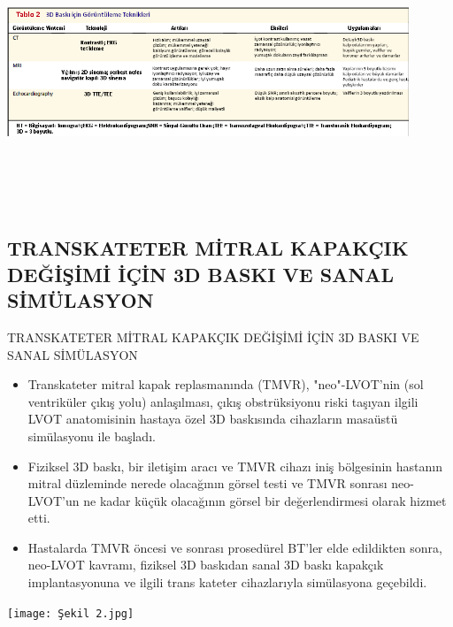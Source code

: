 \documentclass{beamer}
\begin{document}
\begin{frame}{}
\begin{block}{}
\includegraphics[width=12cm,height=8cm]{Tablo 2.png}
\end{block}
\end{frame}

\subsection{TRANSKATETER MİTRAL KAPAKÇIK DEĞİŞİMİ İÇİN 3D BASKI VE SANAL SİMÜLASYON}

\begin{frame}{TRANSKATETER MİTRAL KAPAKÇIK DEĞİŞİMİ İÇİN 3D BASKI VE SANAL SİMÜLASYON}

\begin{itemize}
    \item Transkateter mitral kapak replasmanında (TMVR), "neo"-LVOT'nin (sol ventriküler çıkış yolu) anlaşılması, çıkış obstrüksiyonu riski taşıyan ilgili LVOT anatomisinin hastaya özel 3D baskısında cihazların masaüstü simülasyonu ile başladı. 
    \item Fiziksel 3D baskı, bir iletişim aracı ve TMVR cihazı iniş bölgesinin hastanın mitral düzleminde nerede olacağının görsel testi ve TMVR sonrası neo-LVOT'un ne kadar küçük olacağının görsel bir değerlendirmesi olarak hizmet etti.
    \item Hastalarda TMVR öncesi ve sonrası prosedürel BT'ler elde edildikten sonra, neo-LVOT kavramı, fiziksel 3D baskıdan sanal 3D baskı kapakçık implantasyonuna ve ilgili trans kateter cihazlarıyla simülasyona geçebildi.
\end{itemize}

\end{frame}

\begin{frame}{}
\begin{block}{}
\texttt{[image: Şekil 2.jpg]}
\end{block}
\end{frame}
\end{document}

